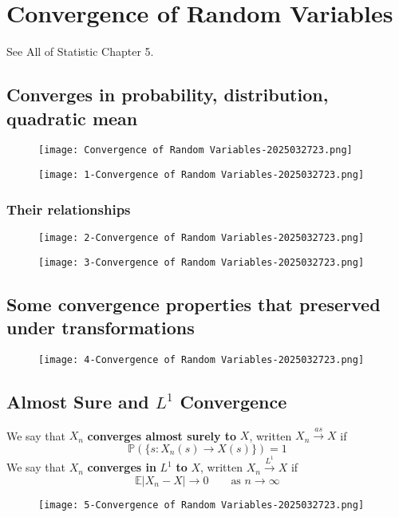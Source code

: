 \section{Convergence of Random Variables}

See All of Statistic Chapter 5.

\subsection{Converges in probability, distribution, quadratic mean}

\begin{figure}[H]
\centering
\texttt{[image: Convergence of Random Variables-2025032723.png]}
\label{}
\end{figure}
\begin{figure}[H]
\centering
\texttt{[image: 1-Convergence of Random Variables-2025032723.png]}
\label{}
\end{figure}

\subsubsection{Their relationships}

\begin{figure}[H]
\centering
\texttt{[image: 2-Convergence of Random Variables-2025032723.png]}
\label{}
\end{figure}

\begin{figure}[H]
\centering
\texttt{[image: 3-Convergence of Random Variables-2025032723.png]}
\label{}
\end{figure}

\subsection{Some convergence properties that preserved under transformations}

\begin{figure}[H]
\centering
\texttt{[image: 4-Convergence of Random Variables-2025032723.png]}
\label{}
\end{figure}

\subsection{Almost Sure and \texorpdfstring{$L^{1}$}{L^1} Convergence}

We say that $X_n$ \textbf{converges almost surely to} $X$, written $X_n\overset{ as }{ \to }X$ if
\[
\mathbb{P}(\{ s:X_n(s)\to X(s) \})=1
\]
We say that $X_n$ \textbf{converges in} $L^{1}$ \textbf{to} $X$, written $X_n\overset{ L^{1} }{ \to }X$ if
\[
\mathbb{E}\lvert X_n-X \rvert \to0\qquad \text{as }n\to \infty
\]
\begin{figure}[H]
\centering
\texttt{[image: 5-Convergence of Random Variables-2025032723.png]}
\label{}
\end{figure}
